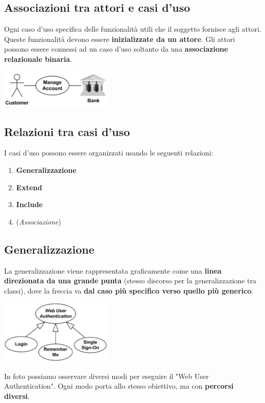 \documentclass{article}
\begin{document}
\subsection*{Associazioni tra attori e casi d'uso}
\large

Ogni caso d'uso specifica delle funzionalità utili che il soggetto fornisce agli attori. Queste funzionalità devono essere \textbf{inizializzate da un attore}. Gli attori possono essere connessi ad un caso d'uso soltanto da una \textbf{associazione relazionale binaria}.
\begin{center}
    \includegraphics[width=0.4\textwidth]{foto 3.png}
\end{center}

\subsection*{Relazioni tra casi d'uso}
\large

I casi d'uso possono essere organizzati usando le seguenti relazioni:
\begin{enumerate}
    \renewcommand{\labelenumi}{-}
    \item \textbf{Generalizzazione}
    \item \textbf{Extend}
    \item \textbf{Include}
    \item (\textit{Associazione})
\end{enumerate}

\subsection*{Generalizzazione}
\large

La generalizzazione viene rappresentata graficamente come una \textbf{linea direzionata da una grande punta} (stesso discorso per la generalizzazione tra classi), dove la freccia va \textbf{dal caso più specifico verso quello più generico}.
\begin{center}
    \includegraphics[width=0.4\textwidth]{foto 4.png}
\end{center}
In foto possiamo osservare diversi modi per eseguire il "Web User Authentication". Ogni modo porta allo stesso obiettivo, ma con \textbf{percorsi diversi}.
\end{document}
